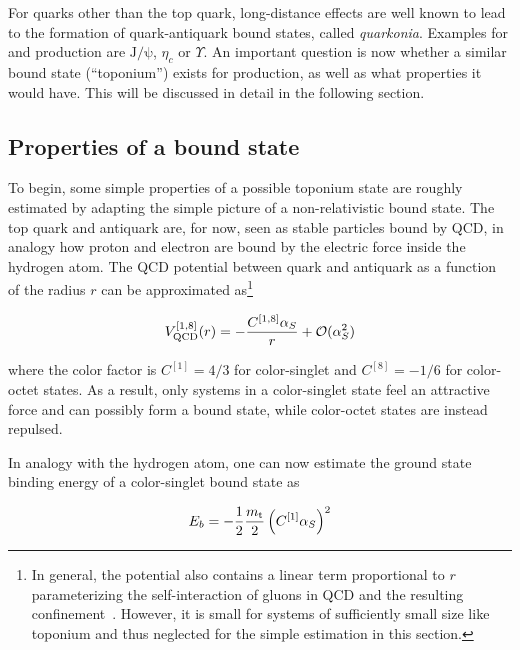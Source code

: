 For quarks other than the top quark, long-distance effects are well known to lead to the formation of quark-antiquark bound states, called \textit{quarkonia}. Examples for \ccbar and \bbbar production are $\mathrm{J/\psi}$, $\eta_c$ or $\Upsilon$. An important question is now whether a similar bound state (``toponium'') exists for \ttbar production, as well as what properties it would have. This will be discussed in detail in the following section.

\subsection{Properties of a \ttbartitle bound state}
\label{sec:theory:toponium_properties}

To begin, some simple properties of a possible toponium state are roughly estimated by adapting the simple picture of a non-relativistic bound state. The top quark and antiquark are, for now, seen as stable particles bound by QCD, in analogy how proton and electron are bound by the electric force inside the hydrogen atom. The QCD potential between quark and antiquark as a function of the radius $r$ can be approximated as\footnote{In general, the potential also contains a linear term proportional to $r$ parameterizing the self-interaction of gluons in QCD and the resulting confinement~\cite{Deur:2016tte}. However, it is small for systems of sufficiently small size like toponium and thus neglected for the simple estimation in this section.}

\begin{equation}
  V_{\mathrm{QCD}}^{[1,8]} (r) = - \frac{C^{[1,8]} \alpha_S}{r} + \mathcal{O}(\alpha_S^2) 
\end{equation}

\noindent where the color factor is $C^{[1]} = 4/3$ for color-singlet and $C^{[8]} = -1/6$ for color-octet \ttbar states. As a result, only \ttbar systems in a color-singlet state feel an attractive force and can possibly form a bound state, while color-octet states are instead repulsed.

In analogy with the hydrogen atom, one can now estimate the ground state binding energy of a color-singlet \ttbar bound state as~\cite{Fadin:1987,Fabiano:1994cz,Maltoni:LHCTopWG}

\begin{equation}
\label{eq:theory:toponium_eb}
  E_b = -\frac{1}{2} \frac{m_{\mathrm{t}}}{2} \left( C^{[1]} \alpha_S \right)^2
\end{equation}


